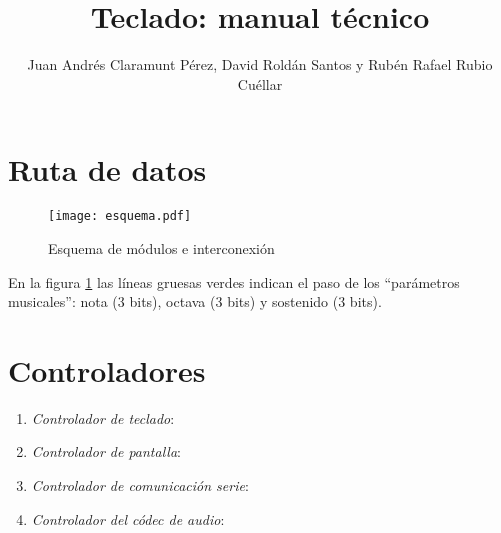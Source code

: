 \documentclass{article}
\title{Teclado: manual técnico}
\author{Juan Andrés Claramunt Pérez, David Roldán Santos y Rubén Rafael Rubio Cuéllar}
\begin{document}
\maketitle

\section{Ruta de datos}

	\begin{figure}[ht]\centering
		\texttt{[image: esquema.pdf]}
		\caption{Esquema de módulos e interconexión}
		\label{fig:esquema}
	\end{figure}

	En la figura \ref{fig:esquema} las líneas gruesas verdes indican el paso de los ``parámetros musicales'': nota (3 bits), octava (3 bits) y sostenido (3 bits).

\section{Controladores}

\begin{enumerate}
	\item {\itshape Controlador de teclado}: 
	\item {\itshape Controlador de pantalla}:
	\item {\itshape Controlador de comunicación serie}:
	\item {\itshape Controlador del códec de audio}:
\end{enumerate}
\end{document}
